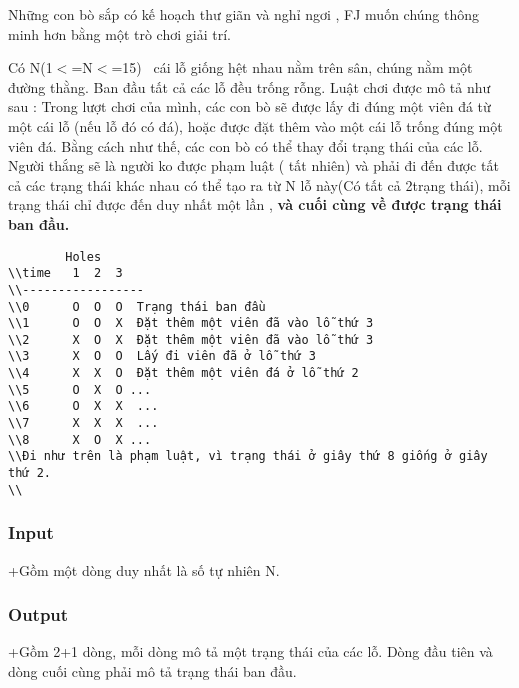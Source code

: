 



   Những con bò sắp có kế hoạch thư giãn và nghỉ ngơi , FJ muốn chúng thông minh hơn bằng một trò chơi giải trí.  

   Có N(1$<$=N$<$=15)  cái lỗ giống hệt nhau nằm trên sân, chúng nằm một đường thằng. Ban đầu tất cả các lỗ đều trống rỗng. Luật chơi được mô tả như sau : Trong lượt chơi của mình, các con bò sẽ được lấy đi đúng một viên đá từ một cái lỗ (nếu lỗ đó có đá), hoặc được đặt thêm vào một cái lỗ trống đúng một viên đá. Bằng cách như thế, các con bò có thể thay đổi trạng thái của các lỗ. Người thắng sẽ là người ko được phạm luật ( tất nhiên) và phải đi đến được tất cả các trạng thái khác nhau có thể tạo ra từ N lỗ này(Có tất cả 2\textasciicircumN trạng thái), mỗi trạng thái chỉ được đến duy nhất một lần ,   \textbf{    và cuối cùng về được trạng thái ban đầu.   }
\begin{verbatim}
        Holes
\\time   1  2  3 
\\-----------------
\\0      O  O  O  Trạng thái ban đầu
\\1      O  O  X  Đặt thêm một viên đã vào lỗ thứ 3
\\2      X  O  X  Đặt thêm một viên đã vào lỗ thứ 3
\\3      X  O  O  Lấy đi viên đã ở lỗ thứ 3
\\4      X  X  O  Đặt thêm một viên đá ở lỗ thứ 2
\\5      O  X  O ...
\\6      O  X  X  ...
\\7      X  X  X  ...
\\8      X  O  X ...
\\Đi như trên là phạm luật, vì trạng thái ở giây thứ 8 giống ở giây thứ 2.
\\\end{verbatim}

\subsubsection{   Input  }

   +Gồm một dòng duy nhất là số tự nhiên N.  

\subsubsection{   Output  }

   +Gồm 2\textasciicircumn+1 dòng, mỗi dòng mô tả một trạng thái của các lỗ. Dòng đầu tiên và dòng cuối cùng phải mô tả trạng thái ban đầu.  


